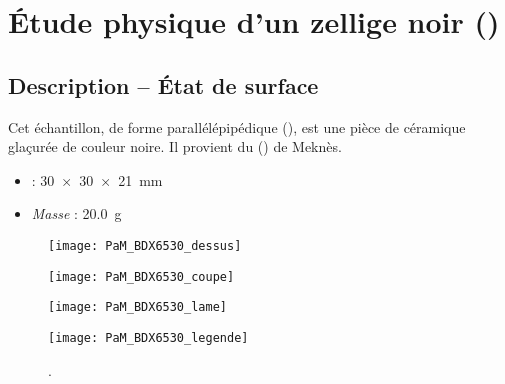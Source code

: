 
\chapter{Étude physique d'un zellige noir ()}

\section{Description -- État de surface}

Cet échantillon, de forme parallélépipédique (), est 
une pièce de céramique glaçurée de couleur noire. Il provient du \PaM 
() de Meknès.

\begin{itemize}
  \item \DimText : \SI{30x30x21}{\mm}
  \item \emph{Masse} : \SI{20.0}{\g}
\end{itemize}

\begin{figure}[htb]
  \begin{minipage}[b]{3.9cm}
    \centerfloat
    \vspace*{0pt}
    \texttt{[image: PaM\_BDX6530\_dessus]}

    \bigskip

    \texttt{[image: PaM\_BDX6530\_coupe]}
  \end{minipage}%
  \qquad%
  \begin{minipage}[b]{4.8cm}
    \centerfloat
    \vspace*{0pt}
    \texttt{[image: PaM\_BDX6530\_lame]}
  \end{minipage}
  \qquad%
  \begin{minipage}[b]{3.2cm}
    \vspace*{0pt}

    \texttt{[image: PaM\_BDX6530\_legende]}

    \bigskip
  \end{minipage}
  \caption[]{\legendeC.}
  \label{dessin:6530}
\end{figure}

